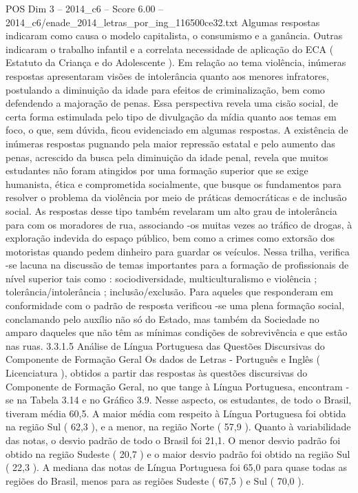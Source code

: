 \begin{textsample}{POS Dim 3 – 2014\_c6 – Score 6.00 – 2014\_c6/enade\_2014\_letras\_por\_ing\_116500ce32.txt}
Algumas respostas indicaram como causa o modelo capitalista, o consumismo e a ganância.
Outras indicaram o trabalho infantil e a correlata necessidade de aplicação do ECA ( Estatuto da Criança e do Adolescente ).
Em relação ao tema violência, inúmeras respostas apresentaram visões de intolerância quanto aos menores infratores, postulando a diminuição da idade para efeitos de criminalização, bem como defendendo a majoração de penas.
Essa perspectiva revela uma cisão social, de certa forma estimulada pelo tipo de divulgação da mídia quanto aos temas em foco, o que, sem dúvida, ficou evidenciado em algumas respostas.
A existência de inúmeras respostas pugnando pela maior repressão estatal e pelo aumento das penas, acrescido da busca pela diminuição da idade penal, revela que muitos estudantes não foram atingidos por uma formação superior que se exige humanista, ética e comprometida socialmente, que busque os fundamentos para resolver o problema da violência por meio de práticas democráticas e de inclusão social.
As respostas desse tipo também revelaram um alto grau de intolerância para com os moradores de rua, associando -os muitas vezes ao tráfico de drogas, à exploração indevida do espaço público, bem como a crimes como extorsão dos motoristas quando pedem dinheiro para guardar os veículos.
Nessa trilha, verifica -se lacuna na discussão de temas importantes para a formação de profissionais de nível superior tais como : sociodiversidade, multiculturalismo e violência ; tolerância/intolerância ; inclusão/exclusão.
Para aqueles que responderam em conformidade com o padrão de resposta verificou -se uma plena formação social, conclamando pelo auxílio não só do Estado, mas também da Sociedade no amparo daqueles que não têm as mínimas condições de sobrevivência e que estão nas ruas. 3.3.1.5 Análise de Língua Portuguesa das Questões Discursivas do Componente de Formação Geral Os dados de Letras - Português e Inglês ( Licenciatura ), obtidos a partir das respostas às questões discursivas do Componente de Formação Geral, no que tange à Língua Portuguesa, encontram -se na Tabela 3.14 e no Gráfico 3.9.
Nesse aspecto, os estudantes, de todo o Brasil, tiveram média 60,5.
A maior média com respeito à Língua Portuguesa foi obtida na região Sul ( 62,3 ), e a menor, na região Norte ( 57,9 ).
Quanto à variabilidade das notas, o desvio padrão de todo o Brasil foi 21,1.
O menor desvio padrão foi obtido na região Sudeste ( 20,7 ) e o maior desvio padrão foi obtido na região Sul ( 22,3 ).
A mediana das notas de Língua Portuguesa foi 65,0 para quase todas as regiões do Brasil, menos para as regiões Sudeste ( 67,5 ) e Sul ( 70,0 ).

\end{textsample}
